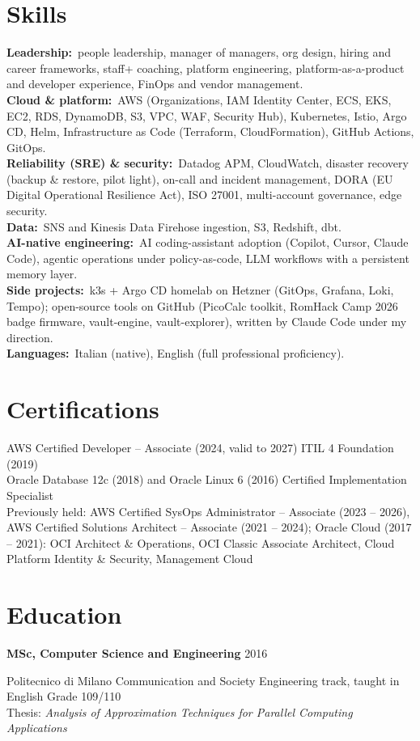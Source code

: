 \documentclass[10pt,a4paper]{article}
\newcommand{\role}[2]{%
  \needspace{6\baselineskip}%
  \vspace{2pt}\textbf{#1} \hfill \textcolor{muted}{#2}\par
}
\begin{document}
\section*{Skills}
\textbf{Leadership:}\ people leadership, manager of managers, org design, hiring and career frameworks, staff+ coaching, platform engineering, platform-as-a-product and developer experience, FinOps and vendor management.\\
\textbf{Cloud \& platform:}\ AWS (Organizations, IAM Identity Center, ECS, EKS, EC2, RDS, DynamoDB, S3, VPC, WAF, Security Hub), Kubernetes, Istio, Argo CD, Helm, Infrastructure as Code (Terraform, CloudFormation), GitHub Actions, GitOps.\\
\textbf{Reliability (SRE) \& security:}\ Datadog APM, CloudWatch, disaster recovery (backup \& restore, pilot light), on-call and incident management, DORA (EU Digital Operational Resilience Act), ISO 27001, multi-account governance, edge security.\\
\textbf{Data:}\ SNS and Kinesis Data Firehose ingestion, S3, Redshift, dbt.\\
\textbf{AI-native engineering:}\ AI coding-assistant adoption (Copilot, Cursor, Claude Code), agentic operations under policy-as-code, LLM workflows with a persistent memory layer.\\
\textbf{Side projects:}\ k3s + Argo CD homelab on Hetzner (GitOps, Grafana, Loki, Tempo); open-source tools on GitHub (PicoCalc toolkit, RomHack Camp 2026 badge firmware, vault-engine, vault-explorer), written by Claude Code under my direction.\\
\textbf{Languages:}\ Italian (native), English (full professional proficiency).

\section*{Certifications}
AWS Certified Developer -- Associate (2024, valid to 2027) \;\textbullet\; ITIL 4 Foundation (2019)\\
Oracle Database 12c (2018) and Oracle Linux 6 (2016) Certified Implementation Specialist\\
Previously held: AWS Certified SysOps Administrator -- Associate (2023 -- 2026), AWS Certified Solutions Architect -- Associate (2021 -- 2024); Oracle Cloud (2017 -- 2021): OCI Architect \& Operations, OCI Classic Associate Architect, Cloud Platform Identity \& Security, Management Cloud

\section*{Education}
\role{MSc, Computer Science and Engineering}{2016}
Politecnico di Milano \textbullet{} Communication and Society Engineering track, taught in English \textbullet{} Grade 109/110\\
Thesis: \textit{Analysis of Approximation Techniques for Parallel Computing Applications}
\end{document}
